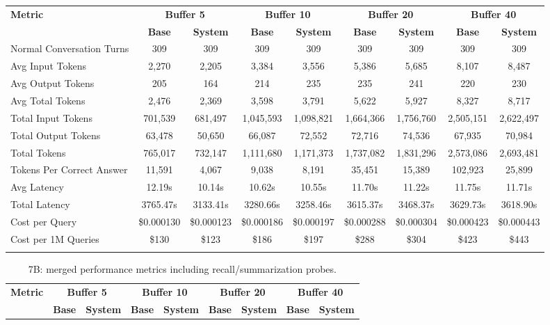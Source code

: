 \begin{landscape}
\begin{longtable}{@{}p{3.8cm}cccccccc@{}}
\toprule
\textbf{Metric} & \multicolumn{2}{c}{\textbf{Buffer 5}} & \multicolumn{2}{c}{\textbf{Buffer 10}} & \multicolumn{2}{c}{\textbf{Buffer 20}} & \multicolumn{2}{c}{\textbf{Buffer 40}} \\
\cmidrule(lr){2-3}\cmidrule(lr){4-5}\cmidrule(lr){6-7}\cmidrule(lr){8-9}
 & \textbf{Base} & \textbf{System} & \textbf{Base} & \textbf{System} & \textbf{Base} & \textbf{System} & \textbf{Base} & \textbf{System} \\
\midrule
\endhead
Normal Conversation Turns & 309 & 309 & 309 & 309 & 309 & 309 & 309 & 309 \\
Avg Input Tokens & 2,270 & 2,205 & 3,384 & 3,556 & 5,386 & 5,685 & 8,107 & 8,487 \\
Avg Output Tokens & 205 & 164 & 214 & 235 & 235 & 241 & 220 & 230 \\
Avg Total Tokens & 2,476 & 2,369 & 3,598 & 3,791 & 5,622 & 5,927 & 8,327 & 8,717 \\
Total Input Tokens & 701,539 & 681,497 & 1,045,593 & 1,098,821 & 1,664,366 & 1,756,760 & 2,505,151 & 2,622,497 \\
Total Output Tokens & 63,478 & 50,650 & 66,087 & 72,552 & 72,716 & 74,536 & 67,935 & 70,984 \\
Total Tokens & 765,017 & 732,147 & 1,111,680 & 1,171,373 & 1,737,082 & 1,831,296 & 2,573,086 & 2,693,481 \\
Tokens Per Correct Answer & 11,591 & 4,067 & 9,038 & 8,191 & 35,451 & 15,389 & 102,923 & 25,899 \\
Avg Latency & 12.19s & 10.14s & 10.62s & 10.55s & 11.70s & 11.22s & 11.75s & 11.71s \\
Total Latency & 3765.47s & 3133.41s & 3280.66s & 3258.46s & 3615.37s & 3468.37s & 3629.73s & 3618.90s \\
Cost per Query & \$0.000130 & \$0.000123 & \$0.000186 & \$0.000197 & \$0.000288 & \$0.000304 & \$0.000423 & \$0.000443 \\
Cost per 1M Queries & \$130 & \$123 & \$186 & \$197 & \$288 & \$304 & \$423 & \$443 \\
\botrule
\end{longtable}
\begin{longtable}{@{}p{3.8cm}cccccccc@{}}
\caption{7B: merged performance metrics including recall/summarization probes.}\label{tab:app_7b_perf_probe}\\

\toprule
\textbf{Metric} & \multicolumn{2}{c}{\textbf{Buffer 5}} & \multicolumn{2}{c}{\textbf{Buffer 10}} & \multicolumn{2}{c}{\textbf{Buffer 20}} & \multicolumn{2}{c}{\textbf{Buffer 40}} \\
\cmidrule(lr){2-3}\cmidrule(lr){4-5}\cmidrule(lr){6-7}\cmidrule(lr){8-9}
 & \textbf{Base} & \textbf{System} & \textbf{Base} & \textbf{System} & \textbf{Base} & \textbf{System} & \textbf{Base} & \textbf{System} \\
\midrule
\endfirsthead


\end{longtable}
\end{landscape}
